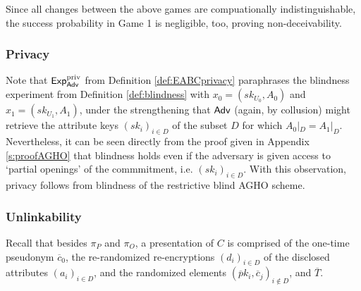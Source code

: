 Since all changes between the above games are compuationally indistinguishable, the success probability in Game 1 is negligible, too, proving non-deceivability.
 
 
 
 
\subsubsection{Privacy}
Note that $\operatorname{\mathsf{Exp}_{\mathsf{Adv}}^{priv}}$ from Definition \ref{def:EABCprivacy} paraphrases the blindness experiment from Definition \ref{def:blindness} with $x_0= (sk_{U_0},A_0)$ and $x_1=(sk_{U_1},A_1)$, under the strengthening that $\mathsf{Adv}$ (again, by collusion) might retrieve the attribute keys $(sk_i)_{i\in D}$ of the subset $D$ for which $A_0|_D = A_1|_D$.
Nevertheless, it can be seen directly from the proof given in Appendix \ref{s:proofAGHO} that blindness holds even if the adversary is given access to `partial openings' of the commmitment, i.e. $(sk_i)_{i\in D}$.
With this observation, privacy follows from blindness of the restrictive blind AGHO scheme.


\subsubsection{Unlinkability}
Recall that besides  $\pi_P$ and $\pi_O$, a presentation of $C$ is comprised of the one-time pseudonym $\overline c_0$, the re-randomized re-encryptions $(d_i)_{i\in D}$ of the disclosed attributes $(a_i)_{i\in D}$, and the  randomized elements $(\overline pk_i, \overline c_j)_{i\notin D}$, and $\overline T$.

